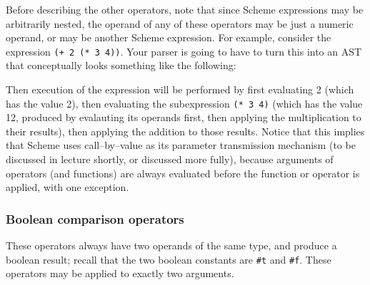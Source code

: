 \documentclass[11pt]{article}
\begin{document}
        \vspace{-2.5mm}

        Before describing the other operators, note that since Scheme
      expressions may be arbitrarily nested, the operand of any of these
      operators may be just a numeric operand, or may be another Scheme
      expression.  For example, consider the expression \texttt{(+ 2 (* 3
      4))}.  Your parser is going to have to turn this into an AST that
      conceptually looks something like the following:

        \vspace{-4mm}

        \begin{center}


        \end{center}

        \vspace{-12mm}

        \enlargethispage{4mm}

        Then execution of the expression will be performed by first evaluating
      2 (which has the value 2), then evaluating the subexpression
      \texttt{(* 3 4)} (which has the value 12, produced by evalauting its
      operands first, then applying the multiplication to their results),
      then applying the addition to those results.  Notice that this implies
      that Scheme uses call--by--value as its parameter transmission
      mechanism (to be discussed in lecture shortly, or discussed more
      fully), because arguments of operators (and functions) are always
      evaluated before the function or operator is applied, with one
      exception.

      \subsubsection{Boolean comparison operators}

        These operators always have two operands of the same type, and produce
      a boolean result; recall that the two boolean constants are
      \texttt{\#t} and \texttt{\#f}.  These operators may be applied to
      exactly two arguments.
\end{document}
